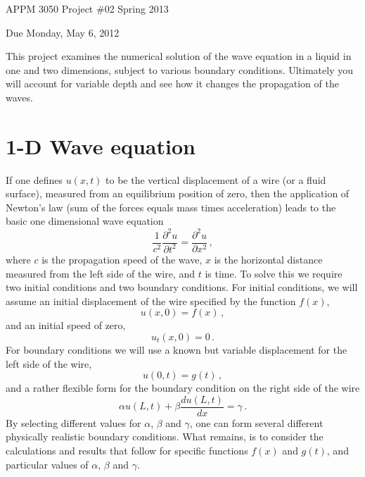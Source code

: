 \documentclass[11pt]{article}
\begin{document}
\baselineskip=14pt

\centerline{APPM 3050 \hfill Project \#02 \hfill Spring 2013}
\centerline{ Due Monday, May 6, 2012}
\bigskip
\bigskip

This project examines the numerical solution of the wave equation
in a liquid in
one and two dimensions, subject to various boundary conditions.
Ultimately you will account for variable depth and see how it changes
the propagation of the waves.

\section{1-D Wave equation}
If one defines $u(x,t)$ to be the vertical displacement of a
wire (or a fluid surface),
measured from an equilibrium position of zero, then
the application of Newton's law (sum of the forces equals mass
times acceleration) leads to the basic one dimensional
wave equation
\begin{equation}
\frac{1}{c^2}\frac{\partial^2 u}{\partial t^2}
     =  \frac{\partial^2 u}{\partial x^2} \,,          \label{1Dwave}
\end{equation}
where $c$ is the propagation speed of the wave, $x$ is the horizontal
distance measured from the left side of the wire, and $t$ is time.
To solve this we require two initial conditions and two boundary
conditions. For initial conditions, we will assume an initial
displacement of the wire specified by the function $f(x)$,
\begin{equation}
u(x,0) = f(x) \,,                \label{initDisplacement}
\end{equation}
and an initial speed of zero,
\begin{equation}
u_t(x,0) = 0 \,.                \label{initSpeed}
\end{equation}
For boundary conditions we will use a known but variable displacement
for the left side of the wire,
\begin{equation}
u(0,t) = g(t) \,,                \label{leftSide}
\end{equation}
and a rather flexible form for the boundary condition on the right
side of the wire
\begin{equation}
\alpha u(L,t) + \beta \frac{du(L,t)}{dx} = \gamma \,.      \label{rightSide}
\end{equation}
By selecting different values for $\alpha$, $\beta$ and $\gamma$,
one can form several different physically realistic boundary
conditions. What remains, is to consider the calculations and results that
follow for specific functions $f(x)$ and $g(t)$, and particular
values of $\alpha$, $\beta$ and $\gamma$.
\end{document}
